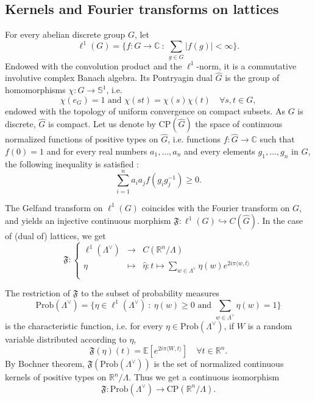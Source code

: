 \documentclass{article}
\begin{document}
\subsection{Kernels and Fourier transforms on lattices} %

For every abelian discrete group $G$, let 
\[\ell^1(G) = \{ f : G \rightarrow \mathbb C \ :\ \sum_{g\in G}|f(g)| < \infty \}.\]
Endowed with the convolution product and the $\ell^1$-norm, it is a commutative involutive complex Banach algebra. Its Pontryagin dual $\hat G$ is the group of homomorphisms $\chi : G\rightarrow \mathbb S^1$, i.e.
\[\chi(e_G ) = 1 \text{ and } \chi(st) = \chi(s)\chi(t) \quad \forall s,t \in G,\]
endowed with the topology of uniform convergence on compact subsets. As $G$ is discrete, $\hat G$ is compact. Let us denote by CP$(\hat G)$ the space of continuous normalized functions of positive types on $\hat G$, i.e. functions $f : \hat G \rightarrow \mathbb C$ such that $f(0) = 1$ and for every real numbers $a_1,\ldots , a_n$ and every elements $g_1,\ldots , g_n$ in $G$, the following inequality is satisfied :
\[\sum_{i=1}^n a_i a_j f(g_ig_j^{-1})\geq 0.\] 
 
The Gelfand transform on $\ell^1(G)$ coincides with the Fourier transform on $G$, and yields an injective continuous morphism $\mathfrak F : \ell^1(G)\hookrightarrow C(\hat G)$. In the case of (dual of) lattices, we get
\[\mathfrak F : \left\{ \begin{array}{rcl}
\ell^1(\Lambda^\vee) & \rightarrow &  C(\mathbb R^n / \Lambda) \\
\eta & \mapsto & \hat \eta : t \mapsto \sum_{w\in \Lambda^\vee} \eta(w) e^{2i\pi \langle w , t\rangle} \\ 
\end{array}\right.\]

The restriction of $\mathfrak F$ to the subset of probability measures
\[\text{Prob}(\Lambda^\vee) =\{\eta\in\ell^1(\Lambda^\vee) \ :\ \eta(w)\geq 0 \text{ and } \sum_{w\in \Lambda^\vee} \eta(w) = 1\}  \]
is the characteristic function, i.e. for every $\eta\in\text{Prob} (\Lambda^\vee)$, if $W$ is a random variable distributed according to $\eta$, 
\[\mathfrak F(\eta)(t) = \mathbb E[e^{2i\pi \langle W , t\rangle } ]\quad\forall t\in \mathbb R^n.\] 
By Bochner theorem, $\mathfrak F(\text{Prob} (\Lambda^\vee))$ is the set of normalized continuous kernels of positive types on $\mathbb R^n / \Lambda$. Thus we get a continuous isomorphism 
\[\mathfrak F : \text{Prob}(\Lambda^\vee ) \rightarrow \text{CP}(\mathbb R^n / \Lambda).\]
\end{document}
